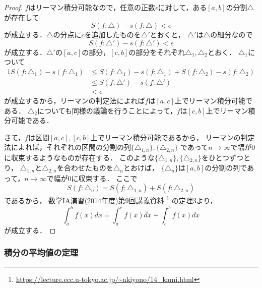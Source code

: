 \documentclass[./index]{subfiles}
\begin{document}
\begin{proof}
    $f$はリーマン積分可能なので，任意の正数$\epsilon$に対して，ある$[a, b]$の分割$\triangle$が存在して
    \begin{equation}
        S(f: \triangle) - s(f: \triangle) < \epsilon
    \end{equation}
    が成立する．$\triangle$の分点に$c$を追加したものを$\triangle'$とおくと，
    $\triangle'$は$\triangle$の細分なので
    \begin{equation}
        S(f: \triangle') - s(f: \triangle') < \epsilon
    \end{equation}
    が成立する．$\triangle'$の$[a, c]$の部分，$[c, b]$の部分をそれぞれ$\triangle_1, \triangle_2$とおく．
    $\triangle_1$について
    \begin{alignat}{1}
        S(f: \triangle_1) - s(f: \triangle_1)
            &\le S(f: \triangle_1) - s(f: \triangle_1) + S(f: \triangle_2) - s(f: \triangle_2) \\
        &\le S(f: \triangle') - s(f: \triangle') \\
        &< \epsilon
    \end{alignat}
    が成立するから，リーマンの判定法によれば$f$は$[a, c]$上でリーマン積分可能である．
    $\triangle_2$についても同様の議論を行うことによって，$f$は$[c, b]$上でリーマン積分可能である．

    さて，$f$は区間$[a, c], [c, b]$上でリーマン積分可能であるから，
    リーマンの判定法によれば，それぞれの区間の分割の列$\{\triangle_{1,n}\}, \{\triangle_{2,n}\}$
    であって$n \rightarrow \infty$で幅が0に収束するようなものが存在する．
    このような$\{\triangle_{1,n}\}, \{\triangle_{2,n}\}$をひとつずつとり，
    $\triangle_{1, n}$と$\triangle_{2, n}$を合わせたものを$\triangle_n$とおけば，
    $\{\triangle_n\}$は$[a, b]$の分割の列であって，$n \rightarrow \infty$で幅が0に収束する．
    ここで
    \begin{equation}
        S(f: \triangle_n) = S(f: \triangle_{1,n}) + S(f: \triangle_{2,n})
    \end{equation}
    であるから，
    数学IA演習(2014年度)第9回講義資料
    \footnote{\url{https://lecture.ecc.u-tokyo.ac.jp/~nkiyono/14_kami.html}}
    の定理3より，
    \begin{equation}
        \int_a^b f(x) dx = \int_a^c f(x) dx + \int_c^b f(x) dx
    \end{equation}
    が成立する．
\end{proof}

\subsubsection{積分の平均値の定理}
\end{document}
